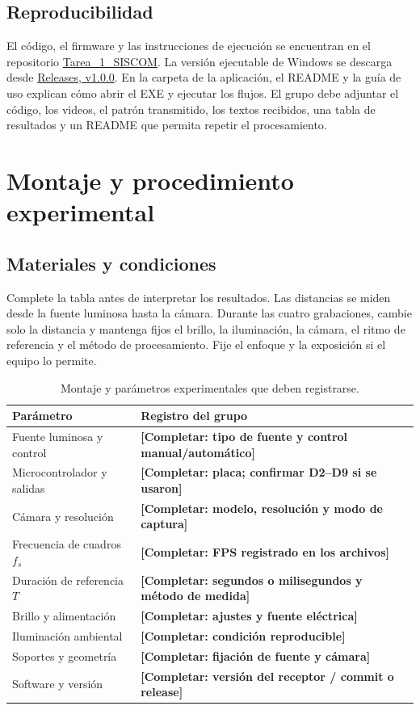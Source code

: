 \documentclass[11pt,a4paper]{article}
\newcommand{\Completar}[1]{\textcolor{Pending}{\textbf{[Completar: #1]}}}
\begin{document}
\subsection{Reproducibilidad}
El código, el firmware y las instrucciones de ejecución se encuentran en el repositorio \href{https://github.com/crmsaavedra/Tarea_1_SISCOM}{Tarea\_1\_SISCOM}. La versión ejecutable de Windows se descarga desde \href{https://github.com/crmsaavedra/Tarea_1_SISCOM/releases/tag/v1.0.0}{Releases, v1.0.0}. En la carpeta de la aplicación, el README y la guía de uso explican cómo abrir el EXE y ejecutar los flujos. El grupo debe adjuntar el código, los videos, el patrón transmitido, los textos recibidos, una tabla de resultados y un README que permita repetir el procesamiento.

\section{Montaje y procedimiento experimental}
\subsection{Materiales y condiciones}
Complete la tabla antes de interpretar los resultados. Las distancias se miden desde la fuente luminosa hasta la cámara. Durante las cuatro grabaciones, cambie solo la distancia y mantenga fijos el brillo, la iluminación, la cámara, el ritmo de referencia y el método de procesamiento. Fije el enfoque y la exposición si el equipo lo permite.

\begin{table}[H]
\centering
\caption{Montaje y parámetros experimentales que deben registrarse.}
\label{tab:setup}
\begin{tabularx}{\textwidth}{p{}Y}
\toprule
Parámetro & Registro del grupo\\
\midrule
Fuente luminosa y control & \Completar{tipo de fuente y control manual/automático}\\
Microcontrolador y salidas & \Completar{placa; confirmar D2--D9 si se usaron}\\
Cámara y resolución & \Completar{modelo, resolución y modo de captura}\\
Frecuencia de cuadros \(f_s\) & \Completar{FPS registrado en los archivos}\\
Duración de referencia \(T\) & \Completar{segundos o milisegundos y método de medida}\\
Brillo y alimentación & \Completar{ajustes y fuente eléctrica}\\
Iluminación ambiental & \Completar{condición reproducible}\\
Soportes y geometría & \Completar{fijación de fuente y cámara}\\
Software y versión & \Completar{versión del receptor / commit o release}\\
\bottomrule
\end{tabularx}
\end{table}
\end{document}
